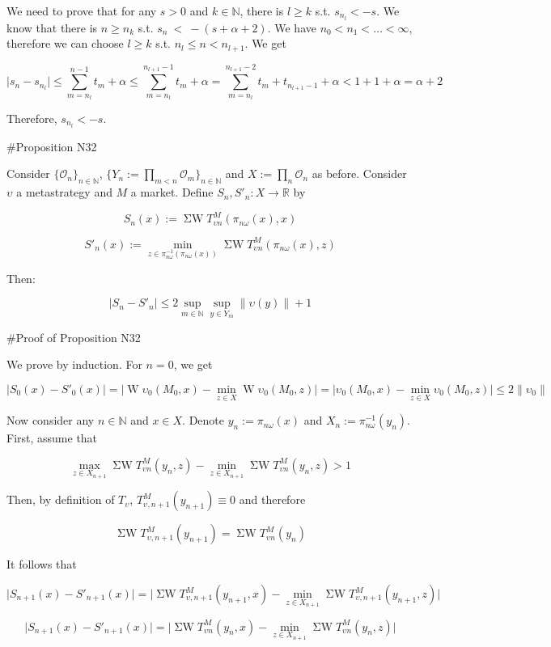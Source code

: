 \documentclass[a4paper]{article}
\newcommand{\Nats}{\mathbb{N}}
\newcommand{\Reals}{\mathbb{R}}
\newcommand{\Sq}[2]{\{#1\}_{#2 \in \Nats}}
\newcommand{\Sqn}[1]{\Sq{#1}{n}}
\newcommand{\Abs}[1]{\lvert #1 \rvert}
\newcommand{\Norm}[1]{\lVert #1 \rVert}
\newcommand{\Ob}{\mathcal{O}}
\newcommand{\W}{\operatorname{W}}
\newcommand{\SW}{\operatorname{\Sigma W}}
\begin{document}
We need to prove that for any ${s > 0}$ and ${k \in \Nats}$, there is ${l \geq k}$ s.t. ${s_{n_l} < -s}$. We know that there is ${n \geq n_k}$ s.t. ${s_n\ <\ -(s+\alpha+2)}$. We have ${n_0 < n_1 < \ldots < \infty}$, therefore we can choose ${l \geq k}$ s.t. ${n_l \leq n < n_{l+1}}$. We get

$$\Abs{s_n-s_{n_l}} \leq \sum_{m=n_l}^{n - 1} t_m + \alpha \leq \sum_{m=n_l}^{n_{l+1} - 1} t_m  + \alpha = \sum_{m=n_l}^{n_{l+1} - 2} t_m + t_{n_{l+1}-1} + \alpha < 1 + 1  + \alpha = \alpha + 2$$

Therefore, ${s_{n_l} < -s}$.

\#Proposition N32

Consider ${\Sqn{\Ob_n}}$, ${\Sqn{Y_n:=\prod_{m < n} \Ob_m}}$ and ${X:=\prod_n \Ob_n}$ as before. Consider ${\upsilon}$ a metastrategy and ${M}$ a market. Define ${S_n,S'_n: X \rightarrow \Reals}$ by 

$$S_n(x):= \SW T^M_{\upsilon n}(\pi_{n\omega}(x),x)$$

$$S'_n(x):= \min_{z \in \pi_{n\omega}^{-1}(\pi_{n\omega}(x))} \SW T^M_{\upsilon n}(\pi_{n\omega}(x),z)$$

Then: 

$${\Abs{S_n-S'_n} \leq 2 \sup_{m \in \Nats} \sup_{y \in Y_m} \Norm{\upsilon(y)}} + 1$$

\#Proof of Proposition N32

We prove by induction. For ${n = 0}$, we get

$$\Abs{S_0(x)-S'_0(x)}=\Abs{\W \upsilon_0(M_0,x) - \min_{z \in X} \W \upsilon_0(M_0,z)}=\Abs{\upsilon_0(M_0,x) - \min_{z \in X} \upsilon_0(M_0,z)} \leq 2 \Norm{\upsilon_0}$$

Now consider any ${n \in \Nats}$ and ${x \in X}$. Denote ${y_n := \pi_{n\omega}(x)}$ and ${X_n := \pi_{n\omega}^{-1}(y_n)}$. First, assume that

$$\max_{z \in X_{n+1}} \SW T^M_{\upsilon n}(y_n,z)-\min_{z \in X_{n+1}} \SW T^M_{\upsilon n}(y_n,z) > 1$$

Then, by definition of ${T_\upsilon}$, ${T^M_{\upsilon,n+1}}(y_{n+1}) \equiv 0$ and therefore

$$\SW T^M_{\upsilon,n+1}(y_{n+1})=\SW T^M_{\upsilon n}(y_{n})$$

It follows that

$$\Abs{S_{n+1}(x)-S'_{n+1}(x)} = \Abs{\SW T^M_{\upsilon,n+1}(y_{n+1},x) - \min_{z \in X_{n+1}}\SW T^M_{\upsilon,n+1}(y_{n+1},z)}$$

$$\Abs{S_{n+1}(x)-S'_{n+1}(x)} = \Abs{\SW T^M_{\upsilon n}(y_n,x) - \min_{z \in X_{n+1}}\SW T^M_{\upsilon n}(y_n,z)}$$
\end{document}
